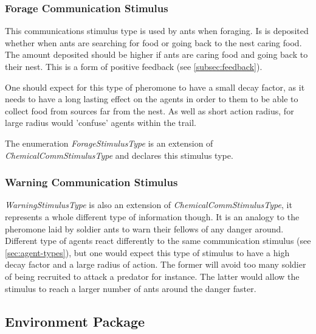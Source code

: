 \subsubsection {Forage Communication Stimulus}
\label{subsec:forage-stimulus}

This communications stimulus type is used by ants when foraging. Is is deposited whether when ants are searching for food or going back to the nest caring food. The amount deposited should be higher if ants are caring food and going back to their nest. This is a form of positive feedback (see \ref{subsec:feedback}).

One should expect for this type of pheromone to have a small decay factor, as it needs to have a long lasting effect on the agents in order to them to be able to collect food from sources far from the nest. As well as short action radius, for large radius would 'confuse' agents within the trail.

The enumeration \emph{ForageStimulusType} is an extension of \emph{ChemicalCommStimulusType} and declares this stimulus type.

\subsubsection {Warning Communication Stimulus}

\emph{WarningStimulusType} is also an extension of \emph{ChemicalCommStimulusType}, it represents a whole different type of information though. It is an analogy to the pheromone laid by soldier ants to warn their fellows of any danger around. Different type of agents react differently to the same communication stimulus (see \ref{sec:agent-types}), but one would expect this type of stimulus to have a high decay factor and a large radius of action. The former will avoid too many soldier of being recruited to attack a predator for instance. The latter would allow the stimulus to reach a larger number of ants around the danger faster.

\subsection{Environment Package}

